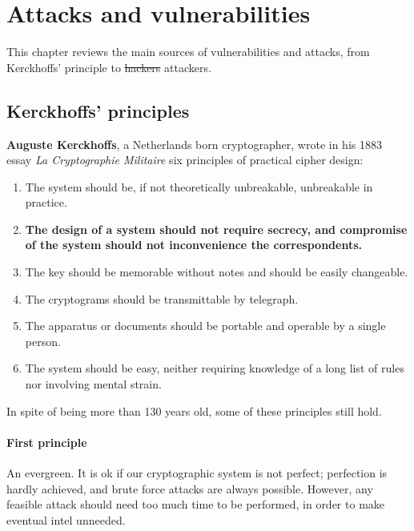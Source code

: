 \chapter{Attacks and vulnerabilities}
\label{ch:attacks_vulnerabilities}
This chapter reviews the main sources of vulnerabilities and attacks, from Kerckhoffs' principle to \sout{hackers} attackers.


\section{Kerckhoffs’ principles}
\textbf{Auguste Kerckhoffs}, a Netherlands born cryptographer, wrote in his 1883 essay \textit{La Cryptographie Militaire} six principles of practical cipher design:

\begin{enumerate}
    \item The system should be, if not theoretically unbreakable, unbreakable in practice.
    \item \textbf{The design of a system should not require secrecy, and compromise of the system should not inconvenience the correspondents.}
    \item The key should be memorable without notes and should be easily changeable.
    \item The cryptograms should be transmittable by telegraph.
    \item The apparatus or documents should be portable and operable by a single person.
    \item The system should be easy, neither requiring knowledge of a long list of rules nor involving mental strain.
\end{enumerate}

In spite of being more than 130 years old, some of these principles still hold.


\subsubsection*{First principle}
An evergreen. It is ok if our cryptographic system is not perfect; perfection is hardly achieved, and brute force attacks are always possible. However, any feasible attack should need too much time to be performed, in order to make eventual intel unneeded.


